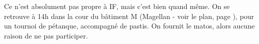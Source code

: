 Ce n'est absolument pas propre à IF, mais c'est bien quand même. On se retrouve à 14h
dans la cour du bâtiment M (Magellan - voir le plan, page \pageref{plan}), pour un tournoi de pétanque, accompagné
de pastis. On fournit le matos, alors aucune raison de ne pas participer.
